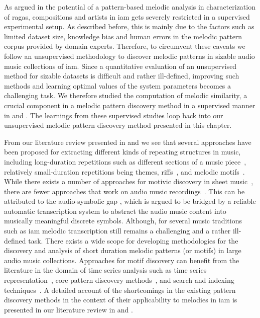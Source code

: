 As argued in  the potential of a pattern-based melodic analysis in characterization of \glspl{raga}, compositions and artists  in \gls{iam} gets severely restricted in a supervised experimental setup. As described before, this is mainly due to the factors such as limited dataset size, knowledge bias and human errors in the melodic pattern corpus provided by domain experts. Therefore, to circumvent these caveats we follow an unsupervised methodology to discover melodic patterns in sizable audio music collections of \gls{iam}. Since a quantitative evaluation of an unsupervised method for sizable datasets is difficult and rather ill-defined, improving such methods and learning optimal values of the system parameters becomes a challenging task. We therefore studied the computation of melodic similarity, a crucial component in a melodic pattern discovery method in a supervised manner in \secref{} and \secref{}. The learnings from these supervised studies loop back into our unsupervised melodic pattern discovery method presented in this chapter. 

From our literature review presented in  and  we see that several approaches have been proposed for extracting different kinds of repeating structures in music, including long-duration repetitions such as different sections of a music piece~\citep{serra2012unsupervised,Goto06TASLP, paulus2010state}, relatively small-duration repetitions being themes, riffs~\citep{Hsu2001a}, and melodic motifs~\citep{meredith2002algorithms,collins2011improved,Janssen2013}. While there exists a number of approaches for motivic discovery in sheet music~\cite{meredith2002algorithms,Cambouropoulos2006,conklin2001representation,Lartillot2005}, there are fewer approaches that work on audio music recordings~\cite{dannenberg2003pattern}. This can be attributed to the audio-symbolic gap \cite{collins2014bridging}, which is argued to be bridged by a reliable automatic transcription system to abstract the audio music content into musically meaningful discrete symbols. Although, for several music traditions such as \gls{iam} melodic transcription still remains a challenging and a rather ill-defined task.  There exists a wide scope for developing methodologies for the discovery and analysis of short duration melodic patterns (or motifs) in large audio music collections. Approaches for motif discovery can benefit from the literature in the domain of time series analysis such as time series representation~\cite{Lin2003}, core pattern discovery methods~\cite{Mueen2009}, and search and indexing techniques~\cite{Rakthanmanon2013}. A detailed account of the shortcomings in the existing pattern discovery methods in the context of their applicability to melodies in \gls{iam} is presented in our literature review in  and .

